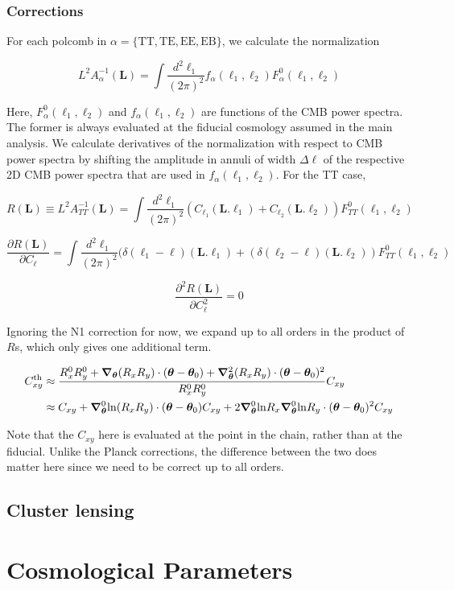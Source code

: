 \documentclass[a4paper, 11pt]{article}
\begin{document}
\subsubsection{Corrections}

\newcommand{\bell}{\boldsymbol{\ell}}
\newcommand{\bL}{\boldsymbol{L}}

For each polcomb in $\alpha=\{\mathrm{TT,TE,EE,EB}\}$, we calculate the normalization

$$
L^2A_{\alpha}^{-1}(\bL) = \int \frac{d^2\bell_1}{(2\pi)^2} f_{\alpha}(\bell_1,\bell_2)F_{\alpha}^0(\bell_1,\bell_2)
$$

Here, $F_{\alpha}^0(\bell_1,\bell_2)$ and $f_{\alpha}(\bell_1,\bell_2)$ are functions of the CMB power spectra. The former is always evaluated at the fiducial cosmology assumed in the main analysis. We calculate derivatives of the normalization with respect to CMB power spectra by shifting the amplitude in annuli of width $\Delta \ell$ of the respective 2D CMB power spectra that are used in $f_{\alpha}(\bell_1,\bell_2)$. For the TT case,

$$
R(\bL) \equiv L^2A_{TT}^{-1}(\bL) = \int \frac{d^2\bell_1}{(2\pi)^2} (C_{\ell_1}(\bL.\bell_1)+C_{\ell_2}(\bL.\bell_2))F_{TT}^0(\bell_1,\bell_2)
$$

$$
\frac{\partial R(\bL)}{\partial C_{\ell}} = \int \frac{d^2\bell_1}{(2\pi)^2} (\delta(\ell_1-\ell)(\bL.\bell_1)+(\delta(\ell_2-\ell)(\bL.\bell_2))F_{TT}^0(\bell_1,\bell_2)
$$

$$
\frac{\partial^2 R(\bL)}{\partial C^2_{\ell}} = 0
$$

Ignoring the N1 correction for now, we expand up to all orders in the product of $R$s, which only gives one additional term.

\begin{align*}
C_{xy}^{\mathrm{th}}&\approx\frac{R^0_xR^0_y+\boldsymbol{\nabla}_{\boldsymbol{\theta}} (R_xR_y)\cdot (\boldsymbol{\theta}-\boldsymbol{\theta}_0)+\boldsymbol{\nabla}^2_{\boldsymbol{\theta}} (R_xR_y)\cdot (\boldsymbol{\theta}-\boldsymbol{\theta}_0)^2}{R^0_xR^0_y}C_{xy}  \\
&\approx C_{xy}+\boldsymbol{\nabla}^0_{\boldsymbol{\theta}} \mathrm{ln}(R_xR_y)\cdot (\boldsymbol{\theta}-\boldsymbol{\theta}_0)C_{xy} +2\boldsymbol{\nabla}^0_{\boldsymbol{\theta}} \mathrm{ln}R_x\boldsymbol{\nabla}^0_{\boldsymbol{\theta}}\mathrm{ln}R_y\cdot (\boldsymbol{\theta}-\boldsymbol{\theta}_0)^2C_{xy} 
\end{align*}

Note that the $C_{xy}$ here is evaluated at the point in the chain, rather than at the fiducial. Unlike the Planck corrections, the difference between the two does matter here since we need to be correct up to all orders.

\subsection{Cluster lensing}



\section{Cosmological Parameters }
\end{document}
